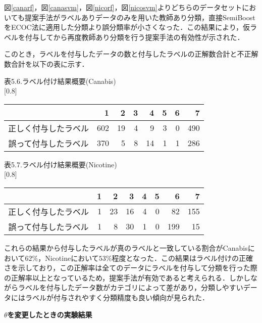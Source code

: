 図\ref{canarf}，図\ref{canasvm}，図\ref{nicorf}，図\ref{nicosvm}よりどちらのデータセットにおいても提案手法がラベルありデータのみを用いた教師あり分類，直接SemiBoostをECOC法に適用した分類より誤分類率が小さくなった．この結果により，仮ラベルを付与してから再度教師あり分類を行う提案手法の有効性が示された．\par


このとき，ラベルを付与したデータの数と付与したラベルの正解数合計と不正解数合計を以下の表に示す．

\begin{center}
表5.6.ラベル付け結果概要(Canabis)\\
\scalebox{0.75}[0.8]{
\begin{tabular}{c|r|r|r|r|r|r|r}
\hline
&1&2&3&4&5&6&7\\
\hline\hline
正しく付与したラベル&602&19&4&9&3&0&490\\
\hline
誤って付与したラベル&370&5&8&14&1&1&286\\
\hline
\end{tabular}
}
\end{center}\par
\begin{center}
表5.7.ラベル付け結果概要(Nicotine)\\
\scalebox{0.75}[0.8]{
\begin{tabular}{c|r|r|r|r|r|r|r}
\hline
&1&2&3&4&5&6&7\\
\hline\hline
正しく付与したラベル&1&23&16&4&0&82&155\\
\hline
誤って付与したラベル&1&8&30&1&0&199&15\\
\hline
\end{tabular}
}
\end{center}\par
\vspace{1.0cm}
これらの結果から付与したラベルが真のラベルと一致している割合がCanabisにおいて$62\%$，Nicotineにおいて$53\%$程度となった．この結果はラベル付けの正確さを示しており，この正解率は全てのデータにラベルを付与して分類を行った際の正解率以上となっているため，提案手法が有効であると考えられる．しかしながらラベルを付与したデータ数がカテゴリによって差があり，分類しやすいデータにはラベルが付与されやすく分類精度も良い傾向が見られた．
\begin{flushleft}
\large{\bfseries {$\theta$を変更したときの実験結果}}
\end{flushleft}



